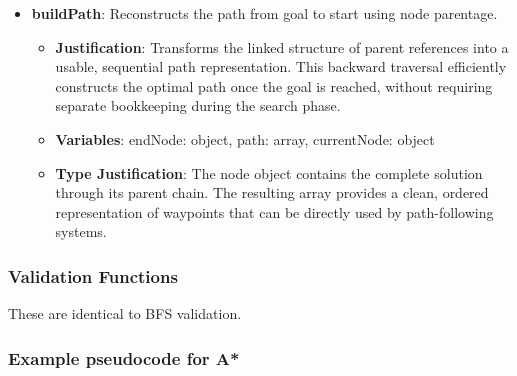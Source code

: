 \begin{itemize}
\item \textbf{buildPath}: Reconstructs the path from goal to start using node parentage. \begin{itemize} \item \textbf{Justification}: Transforms the linked structure of parent references into a usable, sequential path representation. This backward traversal efficiently constructs the optimal path once the goal is reached, without requiring separate bookkeeping during the search phase. \item \textbf{Variables}: endNode: object, path: array, currentNode: object \item \textbf{Type Justification}: The node object contains the complete solution through its parent chain. The resulting array provides a clean, ordered representation of waypoints that can be directly used by path-following systems. \end{itemize} \end{itemize}

\subsubsection*{Validation Functions}

These are identical to BFS validation.

\subsubsection{Example pseudocode for A*}

